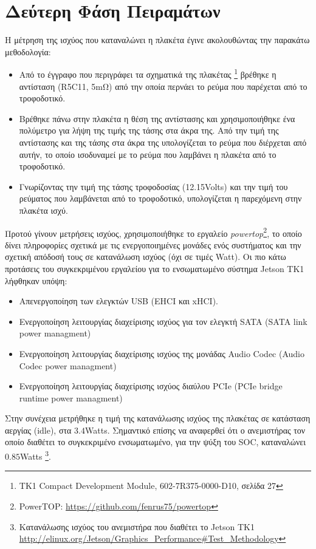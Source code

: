 \section{Δεύτερη Φάση Πειραμάτων}
\label{sec:experiments_phase2}

Η μέτρηση της ισχύος που καταναλώνει η πλακέτα έγινε ακολουθώντας την παρακάτω μεθοδολογία:
\begin{itemize}
  \item{Από το έγγραφο που περιγράφει τα σχηματικά της πλακέτας \footnote{TK1 Compact Development Module,  602-7R375-0000-D10, σελίδα 27}
    βρέθηκε η αντίσταση (R5C11, 5mΩ) από την οποία περνάει το ρεύμα που παρέχεται από το τροφοδοτικό.}
  \item{Βρέθηκε πάνω στην πλακέτα η θέση της αντίστασης και χρησιμοποιήθηκε ένα
    πολύμετρο για λήψη της τιμής της τάσης στα άκρα της.
    Από την τιμή της αντίστασης και της τάσης στα άκρα της υπολογίζεται το ρεύμα που διέρχεται από αυτήν,
    το οποίο ισοδυναμεί με το ρεύμα που λαμβάνει η πλακέτα από το τροφοδοτικό.}
  \item{Γνωρίζοντας την τιμή της τάσης τροφοδοσίας (12.15Volts) και την τιμή
    του ρεύματος που λαμβάνεται από το τροφοδοτικό, υπολογίζεται η παρεχόμενη στην πλακέτα ισχύ.}
\end{itemize}

Προτού γίνουν μετρήσεις ισχύος, χρησιμοποιήθηκε το εργαλείο \emph{powertop}\footnote{PowerTOP: \url{https://github.com/fenrus75/powertop}},
το οποίο δίνει πληροφορίες σχετικά με τις ενεργοποιημένες μονάδες ενός συστήματος
και την σχετική απόδοσή τους σε κατανάλωση ισχύος (όχι σε τιμές Watt).
Οι πιο κάτω προτάσεις του συγκεκριμένου εργαλείου για το
ενσωματωμένο σύστημα Jetson TK1 λήφθηκαν υπόψη:
\begin{itemize}
  \item{Απενεργοποίηση των ελεγκτών USB (EHCI και xHCI).}
  \item{Ενεργοποίηση λειτουργίας διαχείρισης ισχύος για τον ελεγκτή SATA (SATA link power managment)}
  \item{Ενεργοποίηση λειτουργίας διαχείρισης ισχύος της μονάδας Audio Codec (Audio Codec power managment)}
  \item{Ενεργοποίηση λειτουργίας διαχείρισης ισχύος διαύλου PCIe (PCIe bridge runtime power managment)}
\end{itemize}

Στην συνέχεια μετρήθηκε η τιμή της κατανάλωσης ισχύος της πλακέτας σε κατάσταση αεργίας (idle),
στα $3.4$Watts. Σημαντικό επίσης να αναφερθεί ότι ο ανεμιστήρας τον οποίο
διαθέτει το συγκεκριμένο ενσωματωμένο, για την ψύξη του SOC, καταναλώνει $0.85$Watts
\footnote{Κατανάλωσης ισχύος του ανεμιστήρα που διαθέτει το Jetson TK1 \url{http://elinux.org/Jetson/Graphics_Performance\#Test_Methodology}}.

